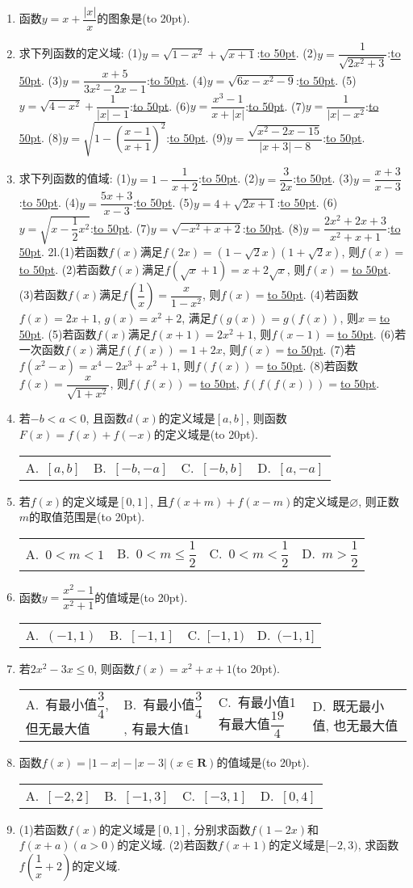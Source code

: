 \documentclass[10pt,a4paper]{article}
\newcommand{\blank}[1]{\underline{\hbox to #1pt{}}}
\newcommand{\bracket}[1]{(\hbox to #1pt{})}
\newcommand{\fourch}[4]{\par\begin{tabular}{p{.23\textwidth}p{.23\textwidth}p{.23\textwidth}p{.23\textwidth}}
A.~#1 &B.~#2& C.~#3& D.~#4
\end{tabular}}
\begin{document}
\begin{enumerate}[1.]
\item 函数$y=x+\dfrac{|x|}x$的图象是\bracket{20}.
\item 求下列函数的定义域:
(1)$y=\sqrt {1-x^2}+\sqrt {x+1}$:\blank{50}.
(2)$y=\dfrac 1{\sqrt {2x^2+3}}$:\blank{50}.
(3)$y=\dfrac{x+5}{3x^2-2x-1}$:\blank{50}.
(4)$y=\sqrt {6x-x^2-9}$:\blank{50}.
(5)$y=\sqrt {4-x^2}+\dfrac 1{|x|-1}$:\blank{50}.
(6)$y=\dfrac{x^3-1}{x+|x|}$:\blank{50}.
(7)$y=\dfrac 1{|x|-x^2}$:\blank{50}.
(8)$y=\sqrt {1-(\dfrac{x-1}{x+1})^2}$:\blank{50}.
(9)$y=\dfrac{\sqrt {x^2-2x-15}}{|x+3|-8}$:\blank{50}.
\item 求下列函数的值域:
(1)$y=1-\dfrac 1{x+2}$:\blank{50}.				(2)$y=\dfrac 3{2x}$:\blank{50}.
(3)$y=\dfrac{x+3}{x-3}$:\blank{50}.					(4)$y=\dfrac{5x+3}{x-3}$:\blank{50}.
(5)$y=4+\sqrt {2x+1}$:\blank{50}.				(6)$y=\sqrt {x-\dfrac 12x^2}$:\blank{50}.
(7)$y=\sqrt {-x^2+x+2}$:\blank{50}.			(8)$y=\dfrac{2x^2+2x+3}{x^2+x+1}$:\blank{50}.
2l.(1)若函数$f(x)$满足$f(2x)=(1-\sqrt 2x)(1+\sqrt 2x)$, 则$f(x)=$\blank{50}.
(2)若函数$f(x)$满足$f(\sqrt x+1)=x+2\sqrt x$, 则$f(x)=$\blank{50}.
(3)若函数$f(x)$满足$f(\dfrac 1x)=\dfrac x{1-x^2}$, 则$f(x)=$\blank{50}.
(4)若函数$f(x)=2x+1$, $g(x)=x^2+2$, 满足$f(g(x))=g(f(x))$, 则$x=$\blank{50}.
(5)若函数$f(x)$满足$f(x+1)=2x^2+1$, 则$f(x-1)=$\blank{50}.
(6)若一次函数$f(x)$满足$f(f(x))=1+2x$, 则$f(x)=$\blank{50}.
(7)若$f(x^2-x)=x^4-2x^3+x^2+1$, 则$f(f(x))=$\blank{50}.
(8)若函数$f(x)=\dfrac x{\sqrt {1+x^2}}$, 则$f(f(x))=$\blank{50}, $f(f(f(x)))=$\blank{50}.
\item 若$-b<a<0$, 且函数$d(x)$的定义域是$[ a,b ]$, 则函数$F(x)=f(x)+f(-x)$的定义域是\bracket{20}.
\fourch{$[ a,b ]$}{$[ -b,-a ]$}{$[ -b,b ]$}{$[ a,-a ]$}
\item 若$f(x)$的定义域是$[ 0,1 ]$, 且$f(x+m)+f(x-m)$的定义域是$\varnothing$, 则正数$m$的取值范围是\bracket{20}.
\fourch{$0<m<1$}{$0<m\le \dfrac 12$}{$0<m<\dfrac 12$}{$m>\dfrac 12$}
\item 函数$y=\dfrac{x^2-1}{x^2+1}$的值域是\bracket{20}.
\fourch{$(-1,1)$}{$[ -1,1 ]$}{$[ -1,1)$}{$(-1,1 ]$}
\item 若$2x^2-3x\le 0$, 则函数$f(x)=x^2+x+1$\bracket{20}.
\fourch{有最小值$\dfrac 34$, 但无最大值}{有最小值$\dfrac 34$, 有最大值1}{有最小值1有最大值$\dfrac{19}4$}{既无最小值, 也无最大值}
\item 函数$f(x)=|1-x|-|x-3|(x\in \mathbf{R})$的值域是\bracket{20}.
\fourch{$[ -2,2 ]$}{$[ -1,3 ]$}{$[ -3,1 ]$}{$[ 0,4 ]$}
\item (1)若函数$f(x)$的定义域是$[ 0,1 ]$, 分别求函数$f(1-2x)$和$f(x+a)(a>0)$的定义域.
   (2)若函数$f(x+1)$的定义域是$[ -2,3)$, 求函数$f(\dfrac 1x+2)$的定义域.

\end{enumerate}
\end{document}
